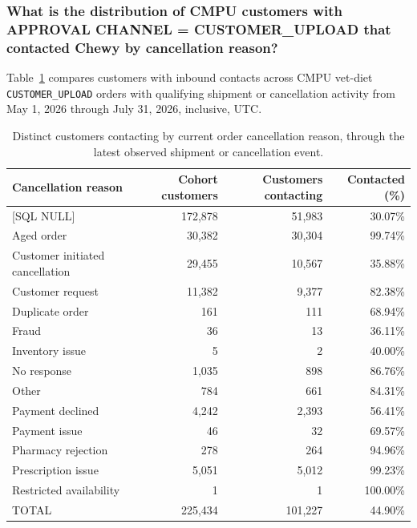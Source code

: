 \subsubsection{What is the distribution of CMPU customers with APPROVAL CHANNEL = CUSTOMER\_UPLOAD that contacted Chewy by cancellation reason?}
Table~\ref{tab:customer-contacts-by-cancellation-reason} compares customers with
inbound contacts across CMPU vet-diet \texttt{CUSTOMER\_UPLOAD} orders with
qualifying shipment or cancellation activity from May 1, 2026 through July 31, 2026, inclusive, UTC.

\begin{table}[!htbp]
\centering
\caption{Distinct customers contacting by current order cancellation reason, through the latest observed shipment or cancellation event.}
\label{tab:customer-contacts-by-cancellation-reason}
\small
\begin{tabular}{@{}lrrr@{}}
\toprule
Cancellation reason & Cohort customers & Customers contacting & Contacted (\%) \\
\midrule
{[SQL NULL]} & 172,878 & 51,983 & 30.07\% \\
\rowcolor{yellow!35}
{Aged order} & 30,382 & 30,304 & 99.74\% \\
{Customer initiated cancellation} & 29,455 & 10,567 & 35.88\% \\
{Customer request} & 11,382 & 9,377 & 82.38\% \\
{Duplicate order} & 161 & 111 & 68.94\% \\
{Fraud} & 36 & 13 & 36.11\% \\
{Inventory issue} & 5 & 2 & 40.00\% \\
{No response} & 1,035 & 898 & 86.76\% \\
{Other} & 784 & 661 & 84.31\% \\
{Payment declined} & 4,242 & 2,393 & 56.41\% \\
{Payment issue} & 46 & 32 & 69.57\% \\
{Pharmacy rejection} & 278 & 264 & 94.96\% \\
{Prescription issue} & 5,051 & 5,012 & 99.23\% \\
{Restricted availability} & 1 & 1 & 100.00\% \\
\midrule
{TOTAL} & 225,434 & 101,227 & 44.90\% \\
\bottomrule
\end{tabular}


\end{table}
